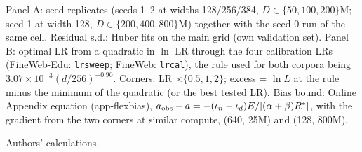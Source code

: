 \begin{table}[tp]
\begin{tablenotes}
Panel A: seed replicates (seeds 1--2 at widths 128/256/384, $D\in\{50,100,200\}$M; seed 1 at width 128, $D\in\{200,400,800\}$M) together with the seed-0 run of the same cell. Residual s.d.: Huber fits on the main grid (own validation set). Panel B: optimal LR from a quadratic in $\ln$ LR through the four calibration LRs (FineWeb-Edu: \texttt{lrsweep}; FineWeb: \texttt{lrcal}), the rule used for both corpora being $3.07\times10^{-3}(d/256)^{-0.90}$. Corners: LR $\times\{0.5,1,2\}$; excess = $\ln L$ at the rule minus the minimum of the quadratic (or the best tested LR). Bias bound: Online Appendix equation (app-flexbias), $a_{\rm obs}-a=-(\iota_n-\iota_d)E/[(\alpha+\beta)R^*]$, with the gradient from the two corners at similar compute, (640, 25M) and (128, 800M).
\end{tablenotes}

\begin{tablenotes}[Source]
Authors' calculations.
\end{tablenotes}
\end{table}
